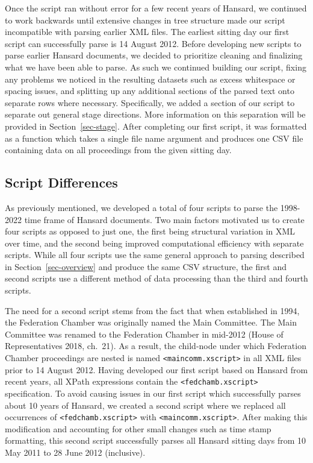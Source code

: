 \documentclass[
  letterpaper,
  DIV=11,
  numbers=noendperiod]{scrartcl}
\begin{document}
Once the script ran without error for a few recent years of Hansard, we
continued to work backwards until extensive changes in tree structure
made our script incompatible with parsing earlier XML files. The
earliest sitting day our first script can successfully parse is 14
August 2012. Before developing new scripts to parse earlier Hansard
documents, we decided to prioritize cleaning and finalizing what we have
been able to parse. As such we continued building our script, fixing any
problems we noticed in the resulting datasets such as excess whitespace
or spacing issues, and splitting up any additional sections of the
parsed text onto separate rows where necessary. Specifically, we added a
section of our script to separate out general stage directions. More
information on this separation will be provided in
Section~\ref{sec-stage}. After completing our first script, it was
formatted as a function which takes a single file name argument and
produces one CSV file containing data on all proceedings from the given
sitting day.

\hypertarget{sec-diff}{%
\subsection{Script Differences}\label{sec-diff}}

As previously mentioned, we developed a total of four scripts to parse
the 1998-2022 time frame of Hansard documents. Two main factors
motivated us to create four scripts as opposed to just one, the first
being structural variation in XML over time, and the second being
improved computational efficiency with separate scripts. While all four
scripts use the same general approach to parsing described in
Section~\ref{sec-overview} and produce the same CSV structure, the first
and second scripts use a different method of data processing than the
third and fourth scripts.

The need for a second script stems from the fact that when established
in 1994, the Federation Chamber was originally named the Main Committee.
The Main Committee was renamed to the Federation Chamber in mid-2012
(House of Representatives 2018, ch.~21). As a result, the child-node
under which Federation Chamber proceedings are nested is named
\texttt{\textless{}maincomm.xscript\textgreater{}} in all XML files
prior to 14 August 2012. Having developed our first script based on
Hansard from recent years, all XPath expressions contain the
\texttt{\textless{}fedchamb.xscript\textgreater{}} specification. To
avoid causing issues in our first script which successfully parses about
10 years of Hansard, we created a second script where we replaced all
occurrences of \texttt{\textless{}fedchamb.xscript\textgreater{}} with
\texttt{\textless{}maincomm.xscript\textgreater{}}. After making this
modification and accounting for other small changes such as time stamp
formatting, this second script successfully parses all Hansard sitting
days from 10 May 2011 to 28 June 2012 (inclusive).
\end{document}
